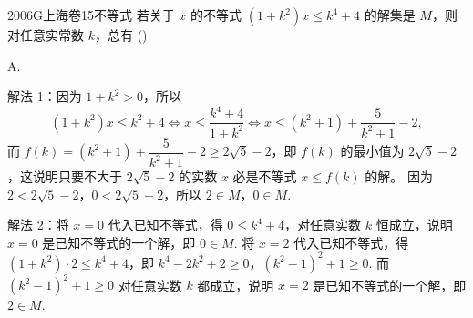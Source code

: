 
\begin{problem}{2006}{G}{上海卷}{15}{不等式}
若关于 $ x $ 的不等式 $ (1+k^2)x\leqslant k^4+4 $ 的解集是 $ M $，则对任意实常数 $ k $，总有 (\hspace{1cm})
\begin{choices}
\end{choices}
\end{problem}

\begin{answer}
A.
\end{answer}

\begin{solutions}
解法 1：因为 $ 1+k^2>0 $，所以
$$
(1+k^2)x\leqslant k^2+4 \Leftrightarrow x\leqslant \frac{k^4+4}{1+k^2} \Leftrightarrow x\leqslant (k^2+1)+\frac{5}{k^2+1}-2,
$$
而 $ f(k)=(k^2+1)+\dfrac{5}{k^2+1}-2\geqslant 2\sqrt{5}-2 $，即 $ f(k) $ 的最小值为 $ 2\sqrt{5}-2 $，这说明只要不大于 $ 2\sqrt{5}-2 $ 的实数 $ x $ 必是不等式 $ x\leqslant f(k) $ 的解。  
因为 $ 2<2\sqrt{5}-2 $，$ 0<2\sqrt{5}-2 $，所以 $ 2\in M $，$ 0\in M $.  

解法 2：将 $ x=0 $ 代入已知不等式，得 $ 0\leqslant k^4+4 $，对任意实数 $ k $ 恒成立，说明 $ x=0 $ 是已知不等式的一个解，即 $ 0\in M $.  
将 $ x=2 $ 代入已知不等式，得 $ (1+k^2)\cdot 2\leqslant k^4+4 $，即 $ k^4-2k^2+2\geqslant 0 $，$ (k^2-1)^2+1\geqslant 0 $.  
而 $ (k^2-1)^2+1\geqslant 0 $ 对任意实数 $ k $ 都成立，说明 $ x=2 $ 是已知不等式的一个解，即 $ 2\in M $.
\end{solutions}